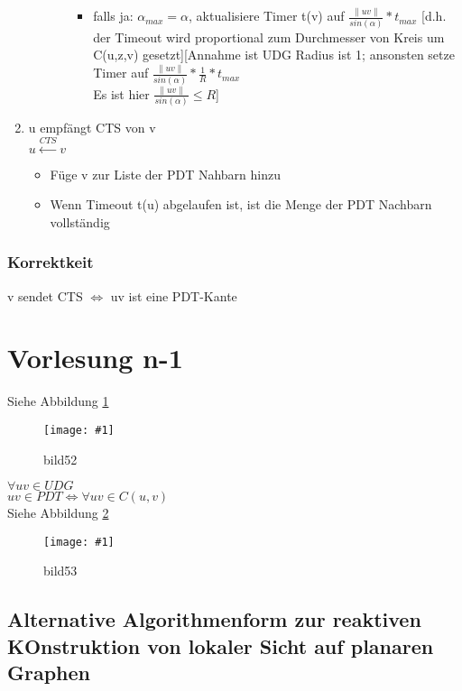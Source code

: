 \documentclass{article}
\newcommand{\bild}[4]{ %
	\begin{figure}[h!]
		\centering
		\texttt{[image: \#1]}
		\caption{#3}
		\label{#4}
	\end{figure}	
}
\newcommand{\sieheBild}[4]{
	Siehe Abbildung \ref{#4}
	\bild{#1}{#2}{#3}{#4}
}
\newcommand{\doubleAbs}[1]{
	\|#1\|
}
\begin{document}
\begin{enumerate}
\begin{itemize}
\begin{itemize}
\begin{itemize}
				\item falls ja: $\alpha_{max} = \alpha$, aktualisiere Timer t(v) auf $\frac{\doubleAbs{uv}}{sin(\alpha)} * t_{max}$ [d.h. der Timeout wird proportional zum Durchmesser von Kreis um    C(u,z,v) gesetzt][Annahme ist UDG Radius ist 1; ansonsten setze Timer auf $\frac{\doubleAbs{uv}}{sin(\alpha)} * \frac{1}{R} * t_{max}$\\
				Es ist hier  $\frac{\doubleAbs{uv}}{sin(\alpha)} \leq R$]
			\end{itemize}
		\end{itemize}
	\end{itemize}
	\item u empfängt CTS von v\\
	$u \overset{CTS}{\leftarrow} v$
	\begin{itemize}
		\item Füge v zur Liste der PDT Nahbarn hinzu
		\item Wenn Timeout t(u) abgelaufen ist, ist die Menge der PDT Nachbarn vollständig
	\end{itemize}
\end{enumerate}
\subsubsection{Korrektkeit}
v sendet CTS $\Leftrightarrow$ uv ist eine PDT-Kante

\section{Vorlesung n-1}
\sieheBild{Bilder/52.png}{0.4}{bild52}{Bild 52}
$\forall uv \in UDG$ \\
$uv \in PDT \Leftrightarrow \forall uv \in C(u,v)$\\
\sieheBild{Bilder/53.png}{0.4}{bild53}{Bild 53}

\subsection{Alternative Algorithmenform zur reaktiven KOnstruktion von lokaler Sicht auf planaren Graphen}
\end{document}
